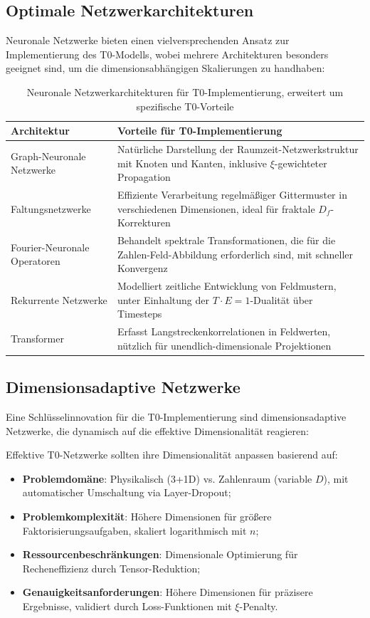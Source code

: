 \subsection{Optimale Netzwerkarchitekturen}
\label{subsec:optimal_architectures}
Neuronale Netzwerke bieten einen vielversprechenden Ansatz zur Implementierung des T0-Modells, wobei mehrere Architekturen besonders geeignet sind, um die dimensionsabhängigen Skalierungen zu handhaben:
\begin{table}[htbp]
	\centering
	\begin{tabular}{lp{8cm}}
		\toprule
		\textbf{Architektur} & \textbf{Vorteile für T0-Implementierung} \\
		\midrule
		Graph-Neuronale Netzwerke & Natürliche Darstellung der Raumzeit-Netzwerkstruktur mit Knoten und Kanten, inklusive $\xi$-gewichteter Propagation \\
		Faltungsnetzwerke & Effiziente Verarbeitung regelmäßiger Gittermuster in verschiedenen Dimensionen, ideal für fraktale $D_f$-Korrekturen \\
		Fourier-Neuronale Operatoren & Behandelt spektrale Transformationen, die für die Zahlen-Feld-Abbildung erforderlich sind, mit schneller Konvergenz \\
		Rekurrente Netzwerke & Modelliert zeitliche Entwicklung von Feldmustern, unter Einhaltung der $T \cdot E = 1$-Dualität über Timesteps \\
		Transformer & Erfasst Langstreckenkorrelationen in Feldwerten, nützlich für unendlich-dimensionale Projektionen \\
		\bottomrule
	\end{tabular}
	\caption{Neuronale Netzwerkarchitekturen für T0-Implementierung, erweitert um spezifische T0-Vorteile}
	\label{tab:network_architectures}
\end{table}
\subsection{Dimensionsadaptive Netzwerke}
\label{subsec:dimension_adaptive}
Eine Schlüsselinnovation für die T0-Implementierung sind dimensionsadaptive Netzwerke, die dynamisch auf die effektive Dimensionalität reagieren:
\begin{formula}
	Effektive T0-Netzwerke sollten ihre Dimensionalität anpassen basierend auf:
	\begin{itemize}
		\item \textbf{Problemdomäne}: Physikalisch (3+1D) vs. Zahlenraum (variable $D$), mit automatischer Umschaltung via Layer-Dropout;
		\item \textbf{Problemkomplexität}: Höhere Dimensionen für größere Faktorisierungsaufgaben, skaliert logarithmisch mit $n$;
		\item \textbf{Ressourcenbeschränkungen}: Dimensionale Optimierung für Recheneffizienz durch Tensor-Reduktion;
		\item \textbf{Genauigkeitsanforderungen}: Höhere Dimensionen für präzisere Ergebnisse, validiert durch Loss-Funktionen mit $\xi$-Penalty.
	\end{itemize}
\end{formula}
